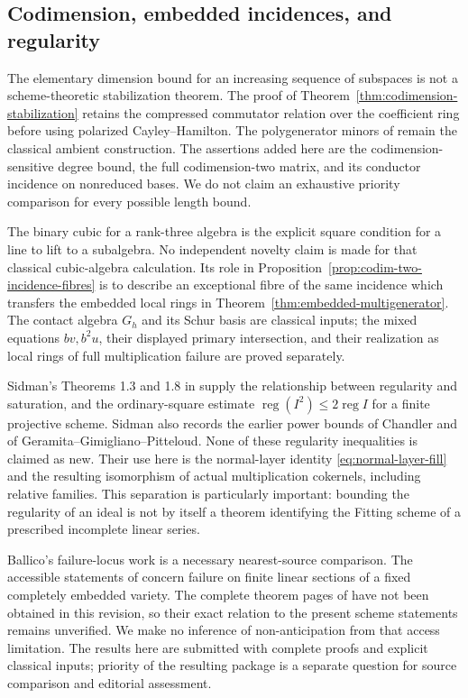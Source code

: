 \subsection*{Codimension, embedded incidences, and regularity}
The elementary dimension bound for an increasing sequence of subspaces
is not a scheme-theoretic stabilization theorem. The proof of
Theorem~\ref{thm:codimension-stabilization} retains the compressed
commutator relation over the coefficient ring before using polarized
Cayley--Hamilton. The polygenerator minors of \cite{ABHS} remain the
classical ambient construction. The assertions added here are the
codimension-sensitive degree bound, the full codimension-two matrix,
and its conductor incidence on nonreduced bases. We do not claim
an exhaustive priority comparison for every possible length bound.

The binary cubic for a rank-three algebra is the explicit square
condition for a line to lift to a subalgebra. No independent novelty
claim is made for that classical cubic-algebra calculation. Its role
in Proposition~\ref{prop:codim-two-incidence-fibres} is to describe
an exceptional fibre of the same incidence which transfers the
embedded local rings in Theorem~\ref{thm:embedded-multigenerator}.
The contact algebra $G_h$ and its Schur basis are classical inputs;
the mixed equations $bv,b^2u$, their displayed primary intersection,
and their realization as local rings of full multiplication failure
are proved separately.

Sidman's Theorems 1.3 and 1.8 in \cite{Sidman} supply the relationship
between regularity and saturation, and the ordinary-square estimate
$\operatorname{reg}(I^2)\le2\operatorname{reg}I$ for a finite
projective scheme. Sidman also records the earlier power bounds of
Chandler and of Geramita--Gimigliano--Pitteloud. None of these
regularity inequalities is claimed as new. Their use here is the
normal-layer identity \eqref{eq:normal-layer-fill} and the resulting
isomorphism of actual multiplication cokernels, including relative
families. This separation is particularly important: bounding the
regularity of an ideal is not by itself a theorem identifying the
Fitting scheme of a prescribed incomplete linear series.

Ballico's failure-locus work \cite{Ballico93,Ballico96} is a necessary
nearest-source comparison. The accessible statements of
\cite[Theorem 0.2, Proposition 2.2, Remark 2.3]{Ballico96} concern
failure on finite linear sections of a fixed completely embedded
variety. The complete theorem pages of \cite{Ballico93} have not
been obtained in this revision, so their exact relation to the
present scheme statements remains unverified. We make no inference
of non-anticipation from that access limitation. The results here
are submitted with complete proofs and explicit classical inputs;
priority of the resulting package is a separate question for source
comparison and editorial assessment.
